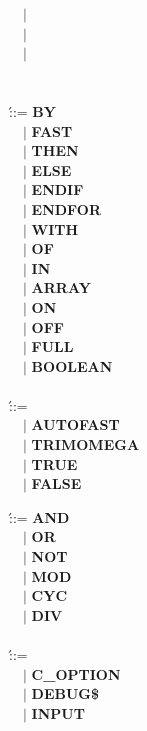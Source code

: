 \begin{bnf_tabbing}
\> ~~$|$ \>  \\
\> ~~$|$ \>  \\
\> ~~$|$ \>  \\
\\
\\
\>  \' ::= \>
   {\bf BY} \\
\> ~~$|$ \> {\bf FAST} \\
\> ~~$|$ \> {\bf THEN} \\
\> ~~$|$ \> {\bf ELSE} \\
\> ~~$|$ \> {\bf ENDIF} \\
\> ~~$|$ \> {\bf ENDFOR} \\
\> ~~$|$ \> {\bf WITH} \\
\> ~~$|$ \> {\bf OF} \\
\> ~~$|$ \> {\bf IN} \\
\> ~~$|$ \> {\bf ARRAY} \\
\> ~~$|$ \> {\bf ON} \\
\> ~~$|$ \> {\bf OFF} \\
\> ~~$|$ \> {\bf FULL} \\
\> ~~$|$ \> {\bf BOOLEAN} \\
\\
\>  \' ::= \>
    \\
\> ~~$|$ \> {\bf AUTOFAST} \\
\> ~~$|$ \> {\bf TRIMOMEGA} \\
\> ~~$|$ \> {\bf TRUE} \\
\> ~~$|$ \> {\bf FALSE} \\
\end{bnf_tabbing}\newpage\begin{bnf_tabbing}
\>  \' ::= \>
   {\bf AND} \\
\> ~~$|$ \> {\bf OR} \\
\> ~~$|$ \> {\bf NOT} \\
\> ~~$|$ \> {\bf MOD} \\
\> ~~$|$ \> {\bf CYC} \\
\> ~~$|$ \> {\bf DIV} \\
\\
\>  \' ::= \> 
    \\
\> ~~$|$ \> {\bf C\_OPTION} \\
\> ~~$|$ \> {\bf DEBUG\$} \\
\> ~~$|$ \> {\bf INPUT} \\

\end{bnf_tabbing}
